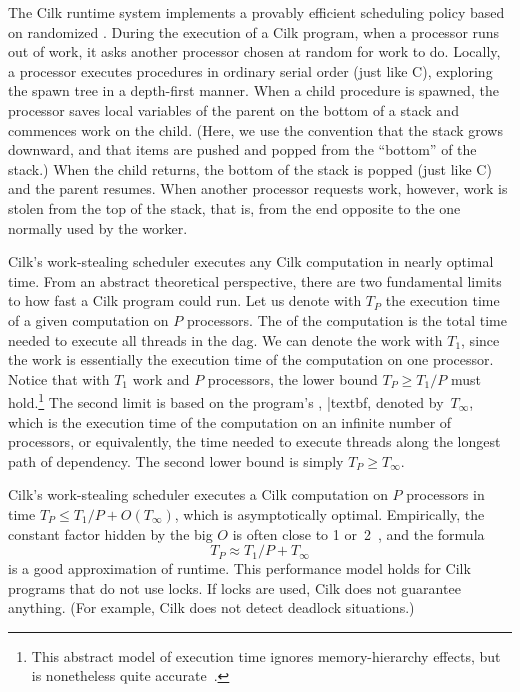 The Cilk runtime system implements a provably efficient scheduling
policy based on randomized
.
During the execution of a Cilk program, when a processor runs out of
work, it asks another processor chosen at random for work to do.
Locally, a processor executes procedures in ordinary serial order
(just like C), exploring the spawn tree in a depth-first manner.  When
a child procedure is spawned, the processor saves local variables of
the parent on the bottom of a stack and commences work on the child.
(Here, we use the convention that the stack grows downward, and that
items are pushed and popped from the ``bottom'' of the stack.)  When
the child returns, the bottom of the stack is popped (just like C) and
the parent resumes.  When another processor requests work, however,
work is stolen from the top of the stack, that is, from the end
opposite to the one normally used by the worker.

\indextim{|(} Cilk's work-stealing scheduler executes any Cilk
computation in nearly optimal time.  From an abstract theoretical
perspective, there are two fundamental limits to how fast a Cilk
program could run.  Let us denote with $T_P$ the execution time of a
given computation on $P$ processors.  The
 of the computation is the
total time needed to execute all threads in the dag.  We can denote
the work with $T_1$, since the work is essentially the execution time
of the computation on one processor.  Notice that with $T_1$ work and
$P$ processors, the lower bound $T_P\geq T_1/P$ must
hold.\footnote{This abstract model of execution time ignores
  memory-hierarchy effects, but is nonetheless quite
  accurate~\cite{BlumofeJoKu95}.}  The second limit is based on the
program's , 
{|textbf}, denoted by~$T_{\infty}$, which is the execution time
of the computation on an infinite number of processors, or
equivalently, the time needed to execute threads along the longest
path of dependency.  The second lower bound is simply $T_P\geq
T_\infty$.

Cilk's work-stealing scheduler executes a Cilk computation on $P$
processors in time $T_P\leq T_1/P + O(T_{\infty})$, which is
asymptotically optimal.  Empirically, the constant factor hidden by
the big $O$ is often close to 1 or~2~\cite{BlumofeJoKu95}, and the
formula
\begin{equation}
T_P \approx T_1/P + T_\infty \label{eq:model}
\end{equation}
is a good approximation of runtime.  This performance model holds for
Cilk programs that do not use locks.  If locks are used, Cilk does not
guarantee anything.  (For example, Cilk does not detect deadlock
situations.)

